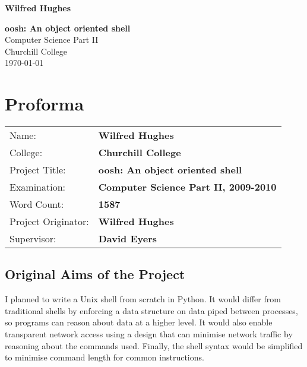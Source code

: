 \documentclass[12pt,twoside,notitlepage]{report}
\begin{document}





\pagestyle{empty}

\hfill{\LARGE \bf Wilfred Hughes}

\vspace*{60mm}
\begin{center}
\Huge
{\bf oosh: An object oriented shell} \\
\vspace*{5mm}
Computer Science Part II \\
\vspace*{5mm}
Churchill College \\
\vspace*{5mm}
\today  %
\end{center}

\cleardoublepage


\setcounter{page}{1}
\pagestyle{plain}

\chapter*{Proforma}

{\large
\begin{tabular}{ll}
Name:               & \bf Wilfred Hughes                       \\
College:            & \bf Churchill College                     \\
Project Title:      & \bf oosh: An object oriented shell \\
Examination:        & \bf Computer Science Part II, 2009-2010        \\
Word Count:         & \bf 1587\footnotemark[1] \\
Project Originator: & \bf Wilfred Hughes                    \\
Supervisor:         & \bf David Eyers                    \\ 
\end{tabular}
}


\section*{Original Aims of the Project}
I planned to write a Unix shell from scratch in Python. It would differ from
traditional shells by enforcing a data structure on data piped between processes,
so programs can reason about data at a higher level. It would also enable
transparent network access using a design that can minimise network traffic by
reasoning about the commands used. Finally, the shell syntax would be simplified
to minimise command length for common instructions.
\end{document}
